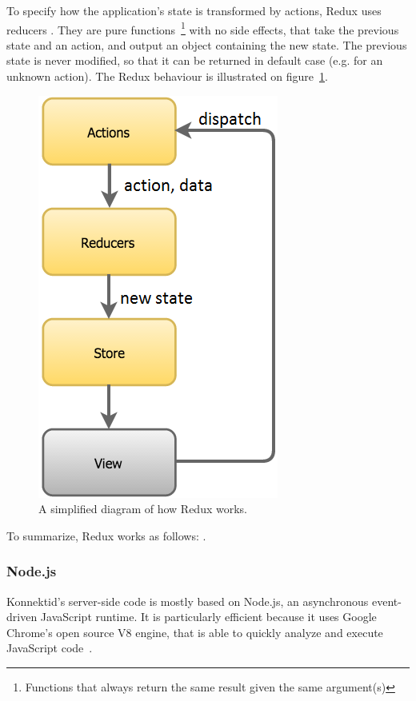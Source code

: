 To specify how the application's state is transformed by actions, Redux uses \guillemotleft{} reducers \guillemotright{}. They are pure functions~\footnote{Functions that always return the same result given the same argument(s)} with no side effects, that take the previous state and an action, and output an object containing the new state. The previous state is never modified, so that it can be returned in default case (e.g. for an unknown action). The Redux behaviour is illustrated on {\sc figure}~\ref{fig:reduxSumup}.

\begin{figure}[H]
    \centering
    \includegraphics[scale=0.7]{figure/reduxFlow.png}
    \caption{A simplified diagram of how Redux works.}
    \label{fig:reduxSumup}
\end{figure}

To summarize, Redux works as follows: .

\subsubsection{Node.js}
\label{sssec:node}

Konnektid's server-side code is mostly based on Node.js, an asynchronous event-driven JavaScript runtime. It is particularly efficient because it uses Google Chrome's open source V8 engine, that is able to quickly analyze and execute JavaScript code~\cite{v8}.

